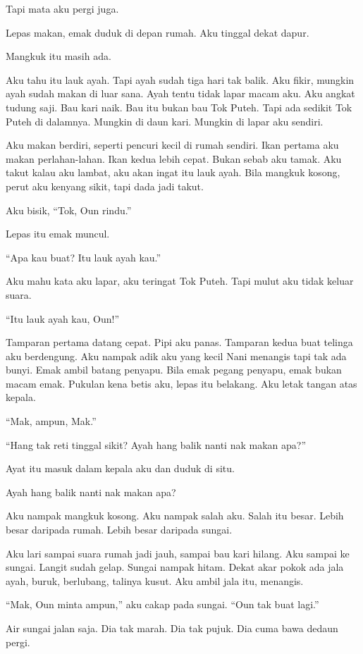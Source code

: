 \documentclass[
  11pt,
  a5paper,
  openany,
  oneside]{book}
\begin{document}
Tapi mata aku pergi juga.

Lepas makan, emak duduk di depan rumah. Aku tinggal dekat dapur.

Mangkuk itu masih ada.

Aku tahu itu lauk ayah. Tapi ayah sudah tiga hari tak balik. Aku fikir,
mungkin ayah sudah makan di luar sana. Ayah tentu tidak lapar macam aku.
Aku angkat tudung saji. Bau kari naik. Bau itu bukan bau Tok Puteh. Tapi
ada sedikit Tok Puteh di dalamnya. Mungkin di daun kari. Mungkin di
lapar aku sendiri.

Aku makan berdiri, seperti pencuri kecil di rumah sendiri. Ikan pertama
aku makan perlahan-lahan. Ikan kedua lebih cepat. Bukan sebab aku tamak.
Aku takut kalau aku lambat, aku akan ingat itu lauk ayah. Bila mangkuk
kosong, perut aku kenyang sikit, tapi dada jadi takut.

Aku bisik, ``Tok, Oun rindu.''

Lepas itu emak muncul.

``Apa kau buat? Itu lauk ayah kau.''

Aku mahu kata aku lapar, aku teringat Tok Puteh. Tapi mulut aku tidak
keluar suara.

``Itu lauk ayah kau, Oun!''

Tamparan pertama datang cepat. Pipi aku panas. Tamparan kedua buat
telinga aku berdengung. Aku nampak adik aku yang kecil Nani menangis
tapi tak ada bunyi. Emak ambil batang penyapu. Bila emak pegang penyapu,
emak bukan macam emak. Pukulan kena betis aku, lepas itu belakang. Aku
letak tangan atas kepala.

``Mak, ampun, Mak.''

``Hang tak reti tinggal sikit? Ayah hang balik nanti nak makan apa?''

Ayat itu masuk dalam kepala aku dan duduk di situ.

Ayah hang balik nanti nak makan apa?

Aku nampak mangkuk kosong. Aku nampak salah aku. Salah itu besar. Lebih
besar daripada rumah. Lebih besar daripada sungai.

Aku lari sampai suara rumah jadi jauh, sampai bau kari hilang. Aku
sampai ke sungai. Langit sudah gelap. Sungai nampak hitam. Dekat akar
pokok ada jala ayah, buruk, berlubang, talinya kusut. Aku ambil jala
itu, menangis.

``Mak, Oun minta ampun,'' aku cakap pada sungai. ``Oun tak buat lagi.''

Air sungai jalan saja. Dia tak marah. Dia tak pujuk. Dia cuma bawa
dedaun pergi.
\end{document}
